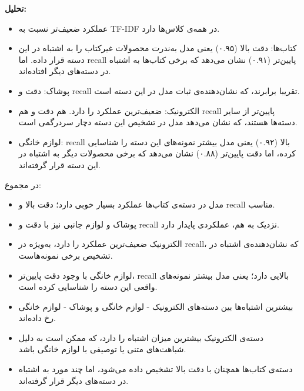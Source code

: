 \documentclass[a4paper,12pt]{article}
\begin{document}
\textbf{تحلیل:}
\begin{itemize}
  \item عملکرد ضعیف‌تر نسبت به TF-IDF در همه‌ی کلاس‌ها دارد.
  \item کتاب‌ها: دقت بالا (۰.۹۵) یعنی مدل به‌ندرت محصولات غیرکتاب را به اشتباه در این دسته قرار داده. اما recall پایین‌تر (۰.۹۱) نشان می‌دهد که برخی کتاب‌ها به اشتباه در دسته‌های دیگر افتاده‌اند.

\item  پوشاک: دقت و recall تقریبا برابرند، که نشان‌دهنده‌ی ثبات مدل در این دسته است.  

  \item الکترونیک: ضعیف‌ترین عملکرد را دارد. هم دقت و هم recall پایین‌تر از سایر دسته‌ها هستند، که نشان می‌دهد مدل در تشخیص این دسته دچار سردرگمی است.

  \item لوازم خانگی: recall بالا (۰.۹۲) یعنی مدل بیشتر نمونه‌های  این دسته را شناسایی کرده، اما دقت پایین‌تر (۰.۸۸) نشان می‌دهد که برخی محصولات دیگر به اشتباه در این دسته قرار گرفته‌اند.
\end{itemize}
در مجموع:
\begin{itemize}
  \item مدل در دسته‌ی کتاب‌ها عملکرد بسیار خوبی دارد؛ دقت بالا و recall مناسب.

\item  پوشاک و لوازم جانبی نیز با دقت و recall نزدیک به هم، عملکردی پایدار دارد.  
  \item الکترونیک ضعیف‌ترین عملکرد را دارد، به‌ویژه در recall، که نشان‌دهنده‌ی اشتباه در تشخیص برخی نمونه‌هاست.

  \item لوازم خانگی با وجود دقت پایین‌تر، recall بالایی دارد؛ یعنی مدل بیشتر نمونه‌های واقعی این دسته را شناسایی کرده است.
  \item بیشترین اشتباه‌ها بین دسته‌های الکترونیک - لوازم خانگی و پوشاک - لوازم خانگی رخ داده‌اند.

  \item دسته‌ی الکترونیک بیشترین میزان اشتباه را دارد، که ممکن است به دلیل شباهت‌های متنی یا توصیفی با لوازم خانگی باشد.

  \item دسته‌ی کتاب‌ها همچنان با دقت بالا تشخیص داده می‌شود، اما چند مورد به اشتباه در دسته‌های دیگر قرار گرفته‌اند.

\end{itemize}

\vspace{0.5cm}
\end{document}
